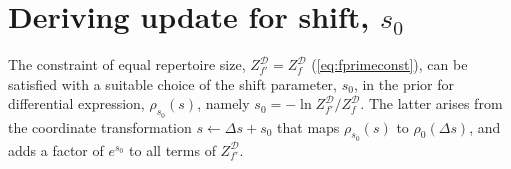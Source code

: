 \documentclass[letterpaper,english,prl,reprint,longbibliography]{revtex4-1} %
\newcommand{\re}[1]{\textcolor{red}{#1}}
\begin{document}
\section{Deriving update for shift, $s_0$} \label{sec:shift_proc}
The constraint of equal repertoire size, $Z^\mathcal{D}_{f'}=Z^\mathcal{D}_f$ (\cref{eq:fprimeconst}), can be satisfied with a suitable choice of the shift parameter, $s_0$, in the prior for differential expression, $\rho_{s_0}(s)$, namely $s_0=-\ln Z^\mathcal{D}_{f'}/Z^\mathcal{D}_{f}$. The latter arises from the coordinate transformation $s\leftarrow\Delta s+s_0$ that maps $\rho_{s_0}(s)$ to $\rho_{0}(\Delta s)$, and adds a factor of $e^{s_0}$ to all terms of $Z^\mathcal{D}_{f'}$.
% 
% 
\end{document}
